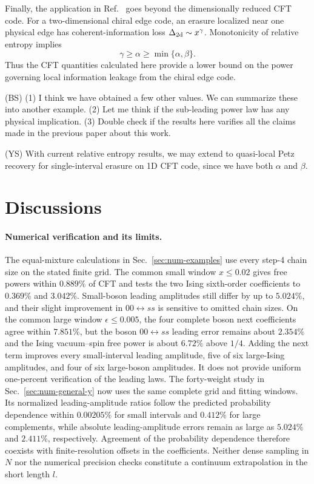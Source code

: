 \documentclass[11pt]{article}
\newcommand{\ep}{\epsilon}
\newcommand{\BS}[1]{{\color{BSorange}\footnotesize{(BS) #1}}}
\newcommand{\YS}[1]{{\color{YSblue}\footnotesize{(YS) #1}}}
\begin{document}
Finally, the application in Ref.~\cite{song2026approximatequantumerrorcorrection} goes beyond the dimensionally
reduced CFT code.  For a two-dimensional chiral edge code, an erasure localized near one physical edge has coherent-information loss $\Delta_{\rm 2d}\sim x^\gamma$.  Monotonicity of relative entropy implies
\begin{equation}
    \gamma\geq\alpha\geq\min\{\alpha,\beta\}.
\end{equation}
Thus the CFT quantities calculated here provide a lower bound on the power governing local information leakage from the chiral edge code. 

\BS{(1) I think we have obtained a few other values. We can summarize these into another example. (2) Let me think if the sub-leading power law has any physical implication. (3) Double check if the results here varifies all the claims made in the previous paper about this work.}

\YS{With current relative entropy results, we may extend to quasi-local Petz recovery for single-interval erasure on 1D CFT code, since we have both $\alpha$ and $\beta$.}



\section{Discussions}

\paragraph{Numerical verification and its limits.}
The equal-mixture calculations in Sec.~\ref{sec:num-examples} use
every step-4 chain size on the stated finite grid. The common small
window $x\leq0.02$ gives free powers within $0.889\%$ of CFT and
tests the two Ising sixth-order coefficients to $0.369\%$ and
$3.042\%$. Small-boson leading amplitudes still differ by up to
$5.024\%$, and their slight improvement in $00\leftrightarrow ss$
is sensitive to omitted chain sizes. On the common large window
$\ep\leq0.005$, the four complete boson next coefficients agree
within $7.851\%$, but the boson $00\leftrightarrow ss$ leading
error remains about $2.354\%$ and the Ising vacuum--spin free
power is about $6.72\%$ above $1/4$. Adding the next term improves
every small-interval leading amplitude, five of six large-Ising
amplitudes, and four of six large-boson amplitudes. It does not
provide uniform one-percent verification of the leading laws.
The forty-weight study in Sec.~\ref{sec:num-general-y} now uses
the same complete grid and fitting windows. Its normalized
leading-amplitude ratios follow the predicted probability
dependence within $0.00205\%$ for small intervals and $0.412\%$
for large complements, while absolute leading-amplitude errors
remain as large as $5.024\%$ and $2.411\%$, respectively.
Agreement of the probability dependence therefore coexists with
finite-resolution offsets in the coefficients.
Neither dense sampling in $N$ nor the numerical precision checks
constitute a continuum extrapolation in the short length $l$.
\end{document}
